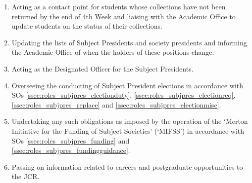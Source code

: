 \begin{enumerate}
	\item Acting as a contact point for students whose collections have not been returned by the end of 4th Week and liaising with the Academic Office to update students on the status of their collections.
	\item Updating the lists of Subject Presidents and society presidents and informing the Academic Office of when the holders of these positions change.
	\item Acting as the Designated Officer for the Subject Presidents.
	\item Overseeing the conducting of Subject President elections in accordance with SOs \ref{ssec:roles_subjpres_electionduty}, \ref{ssec:roles_subjpres_electionreq}, \ref{ssec:roles_subjpres_replace} and \ref{ssec:roles_subjpres_electionmisc}.
	\item Undertaking any such obligations as imposed by the operation of the `Merton Initiative for the Funding of Subject Societies' (`MIFSS') in accordance with SOs \ref{ssec:roles_subjpres_funding} and \ref{ssec:roles_subjpres_fundingguidance}.
	\item Passing on information related to careers and postgraduate opportunities to the JCR.
\end{enumerate}
